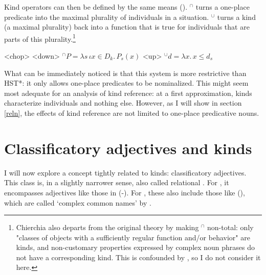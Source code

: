\documentclass[a4paper, 12pt]{article}
\begin{document}
Kind operators can then be defined by the same means (\nextx). $^\cap $ turns a one-place predicate into the maximal plurality of individuals in a situation. $^\cup $ turns a kind (a maximal plurality) back into a function that is true for individuals that are parts of this plurality.\footnote{Chierchia also departs from the original theory by making $^\cap $ non-total: only "classes of objects with a sufficiently regular function and/or behavior" are kinds, and non-customary properties expressed by complex noun phrases do not have a corresponding kind. This is confounded by \parencite{mendia2019referenceadhoc}, so I do not consider it here.}

\pex<chop>
\a<down> $^\cap P = \lambda s\,\iota x\in D_k.\,P_s(x)$
\a<up> $^\cup d = \lambda x.\,x\le d_s$
\xe

What can be immediately noticed is that this system is more restrictive than HST*: it only allows one-place predicates to be nominalized. This might seem most adequate for an analysis of kind reference: at a first approximation, kinds characterize individuals and nothing else. However, as I will show in section \ref{reln}, the effects of kind reference are not limited to one-place predicative nouns.



\section{Classificatory adjectives and kinds}\label{cladj}

I will now explore a concept tightly related to kinds: classificatory adjectives. This class is, in a slightly narrower sense, also called relational \parencite{mcnally2004relationaladjectivesproperties}. For , it encompasses adjectives like those in (-). For \textcite{rutkowski2005classificationprojectionpolish,rutkowski2006classifyingadjectivesnoun}, these also include those like (), which are called `complex common names' by \textcite{gunkel2009classifyingmodifierscommon}.
\end{document}
